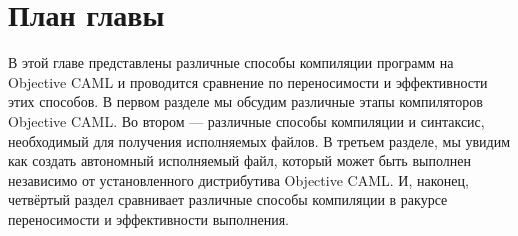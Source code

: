 \section {План главы}

В этой главе представлены различные способы компиляции программ на Objective
CAML и проводится сравнение по переносимости и эффективности этих способов. В
первом разделе мы обсудим различные этапы компиляторов Objective CAML. Во втором
--- различные способы компиляции и синтаксис, необходимый для получения
исполняемых файлов. В третьем разделе, мы увидим как создать автономный
исполняемый файл, который может быть выполнен независимо от установленного
дистрибутива Objective CAML. И, наконец, четвёртый раздел сравнивает различные
способы компиляции в ракурсе переносимости и эффективности выполнения.